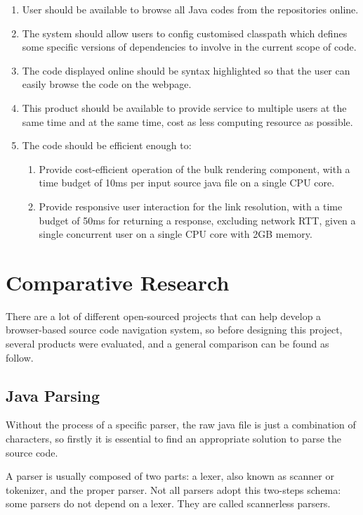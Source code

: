 \documentclass[runningheads]{llncs}
\begin{document}
\begin{enumerate}
	\item User should be available to browse all Java codes from the repositories online.
	\item The system should allow users to config customised classpath which defines some specific versions of dependencies to involve in the current scope of code. 
	\item The code displayed online should be syntax highlighted so that the user can easily browse the code on the webpage.
	\item This product should be available to provide service to multiple users at the same time and at the same time, cost as less computing resource as possible.
	\item The code should be efficient enough to: 
	\begin{enumerate}
		\item Provide cost-efficient operation of the bulk rendering component, with a time budget of 10ms per input source java file on a single CPU core.
		\item Provide responsive user interaction for the link resolution, with a time budget of 50ms for returning a response, excluding network RTT, given a single concurrent user on a single CPU core with 2GB memory.
	\end{enumerate}
\end{enumerate}


\section{Comparative Research}

There are a lot of different open-sourced projects that can help develop a browser-based source code navigation system, so before designing this project, several products were evaluated, and a general comparison can be found as follow.

\subsection{Java Parsing}

Without the process of a specific parser, the raw java file is just a combination of characters, so firstly it is essential to find an appropriate solution to parse the source code. 

A parser is usually composed of two parts: a lexer, also known as scanner or tokenizer, and the proper parser. Not all parsers adopt this two-steps schema: some parsers do not depend on a lexer. They are called scannerless parsers.\cite{parsing-in-java}
\end{document}
